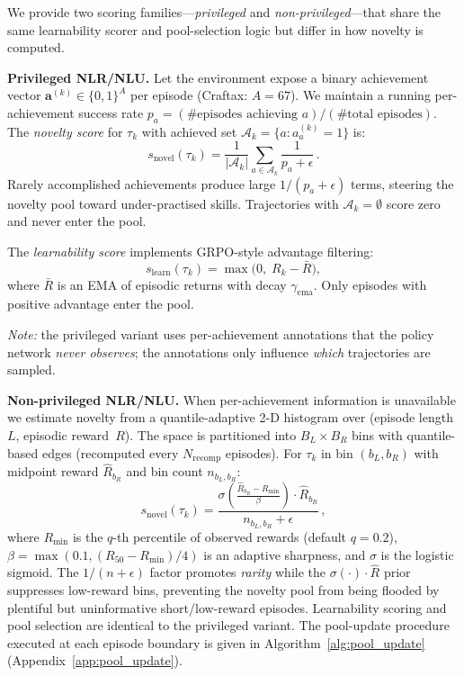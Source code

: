 \documentclass{article}
\begin{document}
We provide two scoring families---\emph{privileged} and
\emph{non-privileged}---that share the same learnability scorer and
pool-selection logic but differ in how novelty is computed.

\medskip\noindent
\textbf{Privileged NLR/NLU.}\quad
Let the environment expose a binary achievement vector
$\bm{a}^{(k)}\!\in\!\{0,1\}^A$ per episode (Craftax: $A\!=\!67$).
We maintain a running per-achievement success rate
$p_a = (\text{\# episodes achieving }a) / (\text{\# total episodes})$.
The \emph{novelty score} for $\tau_k$ with achieved set
$\mathcal{A}_k=\{a:a_a^{(k)}\!=\!1\}$ is:
\begin{equation}
  s_{\mathrm{novel}}(\tau_k)
  =
  \frac{1}{|\mathcal{A}_k|}
  \sum_{a\in\mathcal{A}_k}
  \frac{1}{p_a+\epsilon}\,.
  \label{eq:novelty_priv}
\end{equation}
Rarely accomplished achievements produce large $1/(p_a{+}\epsilon)$
terms, steering the novelty pool toward under-practised skills.
Trajectories with $\mathcal{A}_k\!=\!\emptyset$ score zero and never
enter the pool.

The \emph{learnability score} implements GRPO-style advantage
filtering:
\begin{equation}
  s_{\mathrm{learn}}(\tau_k)
  =
  \max\!\bigl(0,\; R_k - \bar{R}\bigr),
  \label{eq:learnability}
\end{equation}
where $\bar{R}$ is an EMA of episodic returns with decay
$\gamma_{\mathrm{ema}}$.  Only episodes with positive advantage
enter the pool.

\emph{Note:} the privileged variant uses per-achievement annotations
that the policy network \emph{never observes}; the annotations only
influence \emph{which} trajectories are sampled.

\medskip\noindent
\textbf{Non-privileged NLR/NLU.}\quad
When per-achievement information is unavailable we estimate novelty
from a quantile-adaptive 2-D histogram over
(episode length~$L$, episodic reward~$R$).
The space is partitioned into $B_L\times B_R$ bins with
quantile-based edges (recomputed every $N_{\mathrm{recomp}}$
episodes).  For $\tau_k$ in bin $(b_L,b_R)$ with midpoint reward
$\hat{R}_{b_R}$ and bin count $n_{b_L,b_R}$:
\begin{equation}
  s_{\mathrm{novel}}(\tau_k)
  =
  \frac{
    \sigma\!\!\left(\frac{\hat{R}_{b_R}-R_{\min}}{\beta}\right)
    \cdot\hat{R}_{b_R}
  }{
    n_{b_L,b_R}+\epsilon
  }\,,
  \label{eq:novelty_nonpriv}
\end{equation}
where $R_{\min}$ is the $q$-th percentile of observed rewards
(default $q\!=\!0.2$),
$\beta=\max(0.1,(R_{50}-R_{\min})/4)$ is an adaptive sharpness,
and $\sigma$ is the logistic sigmoid.
The $1/(n+\epsilon)$ factor promotes \emph{rarity} while the
$\sigma(\cdot)\cdot\hat{R}$ prior suppresses low-reward bins,
preventing the novelty pool from being flooded by plentiful but
uninformative short/low-reward episodes.
Learnability scoring and pool selection are identical to the
privileged variant.  The pool-update procedure executed at each
episode boundary is given in Algorithm~\ref{alg:pool_update}
(Appendix~\ref{app:pool_update}).
\end{document}
